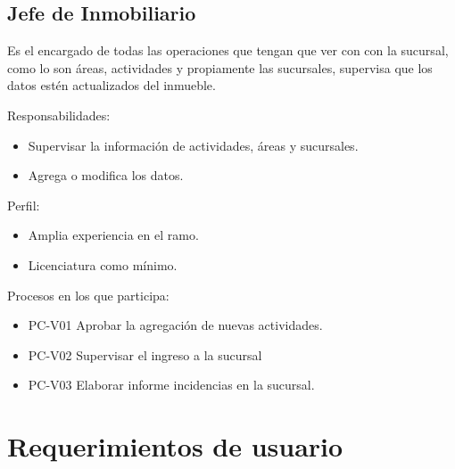 \begin{Usuario}{\subsection{Jefe de Inmobiliario}}{
		Es el encargado de todas las operaciones que tengan que ver con con la sucursal, como lo son áreas, actividades y propiamente las sucursales, supervisa que los datos estén actualizados del inmueble.
	}
	\item[Responsabilidades:] \cdtEmpty
	\begin{itemize}
		\item Supervisar la información de actividades, áreas y sucursales.
		\item Agrega o modifica los datos.
	\end{itemize}
	
	\item[Perfil:] \cdtEmpty
	\begin{itemize}
		\item Amplia experiencia en el ramo.
		\item Licenciatura como mínimo.
	\end{itemize}
	\item[Procesos en los que participa:] \cdtEmpty
	\begin{itemize}
		\item PC-V01 Aprobar la agregación de nuevas actividades.
		\item PC-V02 Supervisar el ingreso a la sucursal
		\item PC-V03 Elaborar informe incidencias en la sucursal.
	\end{itemize}
\end{Usuario}



\section{Requerimientos de usuario}


